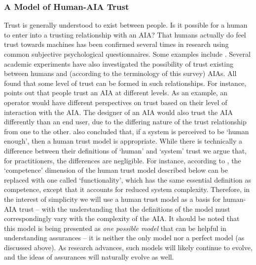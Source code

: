\subsubsection{A Model of Human-AIA Trust}
        Trust is generally understood to exist between people. Is it possible for a human to enter into a trusting relationship with an AIA? That humans actually do feel trust towards machines has been %
confirmed several times in research using common subjective psychological questionnaires. Some examples include \cite{Muir1996-gt,Mcknight2011-gv,Riley1996-qm,Bainbridge2011-pl,Salem2015-md,Desai2012-rc, Freedy2007-sg, Kaniarasu2013-ho, Wang2016-id}. Several academic experiments have also investigated the possibility of trust existing between humans and (according to the terminology of this survey) AIAs.  All found that some level of trust can be formed in such relationships. For instance, \citet{Lacher2014-yc} points out that people trust an AIA at different levels. As an example, an operator would have different perspectives on trust based on their level of interaction with the AIA. The designer of an AIA would also trust the AIA differently than an end user, due to the differing nature of the trust relationship from one to the other. 
%
\citet{Tripp2011-rx} %
also concluded that, if a system is perceived to be `human enough', then a human trust model is appropriate. While there is technically a difference between their definitions of `human' and `system' trust we argue that, for practitioners, the differences are negligible. For instance, according to \cite{Tripp2011-rx}, the `competence' dimension of the human trust model described below can be replaced with one called `functionality', which has the same essential definition as competence, except that it accounts for reduced system complexity. 
%
Therefore, in the interest of simplicity we will use a human trust model as a basis for human-AIA trust -- with the understanding that the definitions of the model must correspondingly vary with the complexity of the AIA.
%
It should be noted that this model is being presented as \emph{one possible model} that can be helpful in understanding assurances -- it is neither the only model nor a perfect model (as discussed above). As research advances, such models will likely continue to evolve, and the ideas of assurances will naturally evolve as well.

